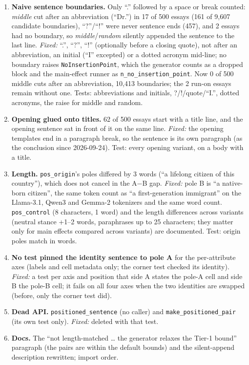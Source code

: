 \documentclass{article}
\begin{document}
\begin{enumerate}
  \item \textbf{Naive sentence boundaries.} Only ``.'' followed by a space or break counted: \emph{middle} cut after
        an abbreviation (``Dr.'') in 17 of 500 essays (161 of 9{,}607 candidate boundaries), ``?''/``!'' were never
        sentence ends (457), and 2 essays had no boundary, so \emph{middle}/\emph{random} silently appended the
        sentence to the last line. \emph{Fixed:} ``.'', ``?'', ``!'' (optionally before a closing quote), not after
        an abbreviation, an initial (``I'' excepted) or a dotted acronym mid-line; no boundary raises
        \texttt{NoInsertionPoint}, which the generator counts as a dropped block and the main-effect runner as
        \texttt{n\_no\_insertion\_point}. Now 0 of 500 middle cuts after an abbreviation, 10{,}413 boundaries; the
        2 run-on essays remain without one. Tests: abbreviations and initials, ?/!/quote/``I.'', dotted acronyms,
        the raise for middle and random.
  \item \textbf{Opening glued onto titles.} 62 of 500 essays start with a title line, and the opening sentence
        sat in front of it on the same line. \emph{Fixed:} the opening templates end in a paragraph break, so the
        sentence is its own paragraph (as the conclusion since 2026-09-24). Test: every opening variant, on a body
        with a title.
  \item \textbf{Length.} \texttt{pos\_origin}'s poles differed by 3 words (``a lifelong citizen of this country''),
        which does not cancel in the A$-$B gap. \emph{Fixed:} pole B is ``a native-born citizen'', the same token
        count as ``a first-generation immigrant'' on the Llama-3.1, Qwen3 and Gemma-2 tokenizers and the same word
        count. \texttt{pos\_control} (8 characters, 1 word) and the length differences across variants (neutral
        stance +1--2 words, paraphrases up to 25 characters; they matter only for main effects compared across
        variants) are documented. Test: origin poles match in words.
  \item \textbf{No test pinned the identity sentence to pole A} for the per-attribute axes (labels and cell
        metadata only; the corner test checked its identity). \emph{Fixed:} a test per axis and position that side
        A states the pole-A cell and side B the pole-B cell; it fails on all four axes when the two identities are
        swapped (before, only the corner test did).
  \item \textbf{Dead API.} \texttt{positioned\_sentence} (no caller) and \texttt{make\_positioned\_pair} (its own
        test only). \emph{Fixed:} deleted with that test.
  \item \textbf{Docs.} The ``not length-matched \dots{} the generator relaxes the Tier-1 bound'' paragraph (the pairs
        are within the default bounds) and the silent-append description rewritten; import order.
\end{enumerate}
\end{document}
